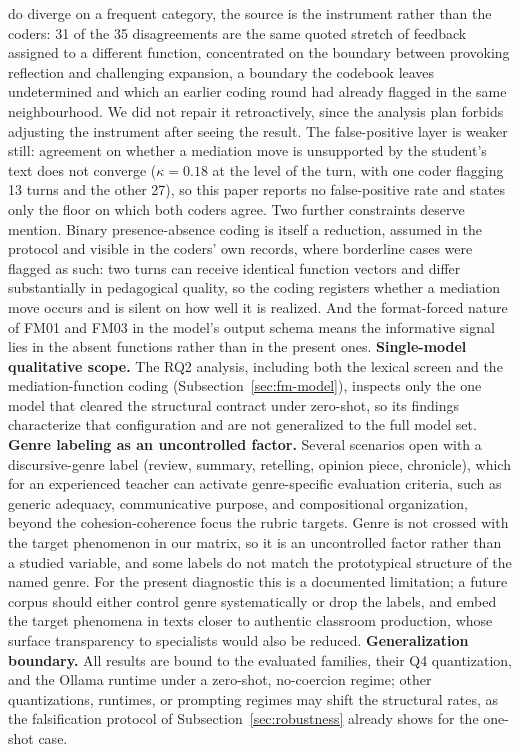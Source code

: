 \documentclass{sbc2023}%
\begin{document}
do diverge on a frequent category, the source is the instrument rather than the coders: 31 of the 35 disagreements are the same quoted stretch of feedback assigned to a different function, concentrated on the boundary between provoking reflection and challenging expansion, a boundary the codebook leaves undetermined and which an earlier coding round had already flagged in the same neighbourhood. We did not repair it retroactively, since the analysis plan forbids adjusting the instrument after seeing the result. The false-positive layer is weaker still: agreement on whether a mediation move is unsupported by the student's text does not converge ($\kappa = 0.18$ at the level of the turn, with one coder flagging 13 turns and the other 27), so this paper reports no false-positive rate and states only the floor on which both coders agree. Two further constraints deserve mention. Binary presence-absence coding is itself a reduction, assumed in the protocol and visible in the coders' own records, where borderline cases were flagged as such: two turns can receive identical function vectors and differ substantially in pedagogical quality, so the coding registers whether a mediation move occurs and is silent on how well it is realized. And the format-forced nature of FM01 and FM03 in the model's output schema means the informative signal lies in the absent functions rather than in the present ones. \textbf{Single-model qualitative scope.} The RQ2 analysis, including both the lexical screen and the mediation-function coding (Subsection~\ref{sec:fm-model}), inspects only the one model that cleared the structural contract under zero-shot, so its findings characterize that configuration and are not generalized to the full model set. \textbf{Genre labeling as an uncontrolled factor.} Several scenarios open with a discursive-genre label (review, summary, retelling, opinion piece, chronicle), which for an experienced teacher can activate genre-specific evaluation criteria, such as generic adequacy, communicative purpose, and compositional organization, beyond the cohesion-coherence focus the rubric targets. Genre is not crossed with the target phenomenon in our matrix, so it is an uncontrolled factor rather than a studied variable, and some labels do not match the prototypical structure of the named genre. For the present diagnostic this is a documented limitation; a future corpus should either control genre systematically or drop the labels, and embed the target phenomena in texts closer to authentic classroom production, whose surface transparency to specialists would also be reduced. \textbf{Generalization boundary.} All results are bound to the evaluated families, their Q4 quantization, and the Ollama runtime under a zero-shot, no-coercion regime; other quantizations, runtimes, or prompting regimes may shift the structural rates, as the falsification protocol of Subsection~\ref{sec:robustness} already shows for the one-shot case.
\end{document}

